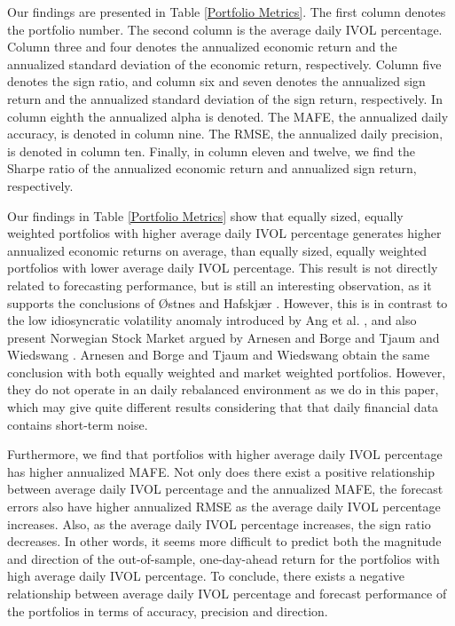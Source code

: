 Our findings are presented in Table \ref{Portfolio Metrics}. The first column denotes the portfolio number. The second column is the average daily IVOL percentage. Column three and four denotes the annualized economic return and the annualized standard deviation of the economic return, respectively. Column five denotes the sign ratio, and column six and seven denotes the annualized sign return and the annualized standard deviation of the sign return, respectively. In column eighth the annualized alpha is denoted. The MAFE, the annualized daily accuracy, is denoted in column nine. The RMSE, the annualized daily precision, is denoted in column ten. Finally, in column eleven and twelve, we find the Sharpe ratio of the annualized economic return and annualized sign return, respectively. 

Our findings in Table \ref{Portfolio Metrics} show that equally sized, equally weighted portfolios with higher average daily IVOL percentage generates higher annualized economic returns on average, than equally sized, equally weighted portfolios with lower average daily IVOL percentage. This result is not directly related to forecasting performance, but is still an interesting observation, as it supports the conclusions of Østnes and Hafskjær \cite{ostnes}. However, this is in contrast to the low idiosyncratic volatility anomaly introduced by Ang et al. \cite{angetal06}, and also present Norwegian Stock Market argued by Arnesen and Borge \cite{arnborge} and Tjaum and Wiedswang \cite{thaumwiedswang}. Arnesen and Borge \cite{arnborge} and Tjaum and Wiedswang \cite{thaumwiedswang} obtain the same conclusion with both equally weighted and market weighted portfolios. However, they do not operate in an daily rebalanced environment as we do in this paper, which may give quite different results considering that that daily financial data contains short-term noise. 

Furthermore, we find that portfolios with higher average daily IVOL percentage has higher annualized MAFE. Not only does there exist a positive relationship between average daily IVOL percentage and the annualized MAFE, the forecast errors also have higher annualized RMSE as the average daily IVOL percentage increases. Also, as the average daily IVOL percentage increases, the sign ratio decreases. In other words, it seems more difficult to predict both the magnitude and direction of the out-of-sample, one-day-ahead return for the portfolios with high average daily IVOL percentage. To conclude, there exists a negative relationship between average daily IVOL percentage and forecast performance of the portfolios in terms of accuracy, precision and direction. 

